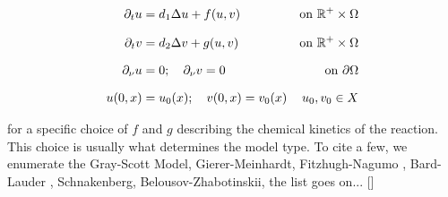 \begin{align}
	\del_t u &= d_1 \lap u + f(u, v) &\text{on} \ \R^{+} \times \Omega \notag \\[0.7em]
	\del_t v &= d_2 \lap v + g(u, v) & \text{on} \ \R^{+} \times \Omega \\[0.7em]
	\del_\nu u & = 0; \quad \del_\nu v = 0 & \text{on} \ \del\Omega \notag \\[0.7em]
	u(0, x) &= u_0(x) ; \quad v(0, x) = v_0(x) & u_0, v_0 \in X
\end{align}
\label{eq:TuringModel}


for a specific choice of $f$ and $g$ describing the chemical kinetics of the reaction. This choice is usually what determines the model type. To cite a few, we enumerate the Gray-Scott Model,  Gierer-Meinhardt, Fitzhugh-Nagumo , Bard-Lauder , Schnakenberg, Belousov-Zhabotinskii, the list goes on... []

